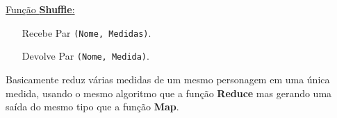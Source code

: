 \documentclass[brazil]{beamer}
\begin{document}
\begin{frame}[fragile]
  \underline{\Large Função \textbf{Shuffle}:}
  
  \vspace{4pt}
  \begin{itemize}
    \pause
    \item[Recebe] Par \verb$(Nome, Medidas)$.
    \pause
    \item[Devolve] Par \verb$(Nome, Medida)$.
  \end{itemize}
  \pause
  \hspace{10pt}
  Basicamente reduz várias medidas de um mesmo personagem em uma única medida,
  usando o mesmo algoritmo que a função \textbf{Reduce} mas gerando uma saída do
  mesmo tipo que a função \textbf{Map}.
\end{frame}
\end{document}
